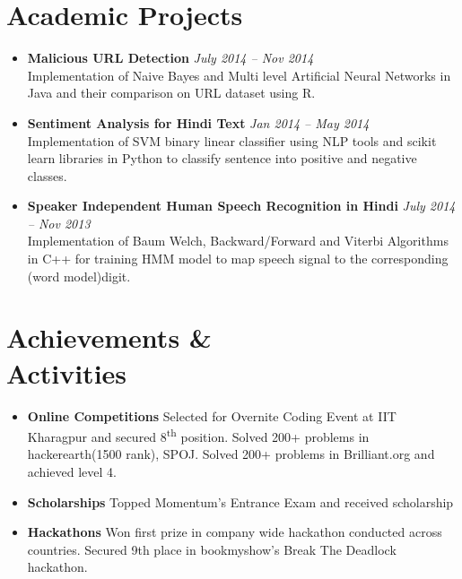\documentclass[margin,line]{resume}
\begin{document}
\begin{resume}
    \section{\mysidestyle Academic Projects}
    \vspace{0mm}
       \begin{itemize}
            \item \textbf{Malicious URL Detection} \hfill \textsl{July 2014 -- Nov 2014}\\ Implementation of Naive Bayes and Multi level Artificial Neural Networks in Java and their comparison on URL dataset using R.
            \item \textbf{Sentiment Analysis for Hindi Text} \hfill \textsl{Jan 2014 -- May 2014}\\ Implementation of SVM binary linear classifier using NLP tools and scikit learn libraries in Python to classify sentence into positive and negative classes.
            \item \textbf{Speaker Independent Human Speech Recognition in Hindi} \hfill \textsl{July 2014 -- Nov 2013}\\ Implementation of Baum Welch, Backward/Forward and Viterbi Algorithms in C++ for training HMM model to map speech signal to the corresponding (word model)digit.
       \end{itemize}
\section{\mysidestyle Achievements \& \\ Activities}
\vspace{0mm}
    \begin{itemize}
            \item \textbf{Online Competitions} \vspace{0mm}
                \subitem Selected for Overnite Coding Event at IIT Kharagpur and secured 8​\textsuperscript{th}​ position.
                \subitem Solved 200+ problems in hackerearth(1500 rank), SPOJ.
                \subitem Solved 200+ problems in Brilliant.org and achieved level 4.
            \item \textbf{Scholarships} \vspace{0mm}
                \subitem Topped Momentum's Entrance Exam and received scholarship
            \item \textbf{Hackathons} \vspace{0mm}
                \subitem Won first prize in company wide hackathon conducted across countries.
                \subitem Secured 9th place in bookmyshow's Break The Deadlock hackathon.
    \end{itemize}




\end{resume}
\end{document}
